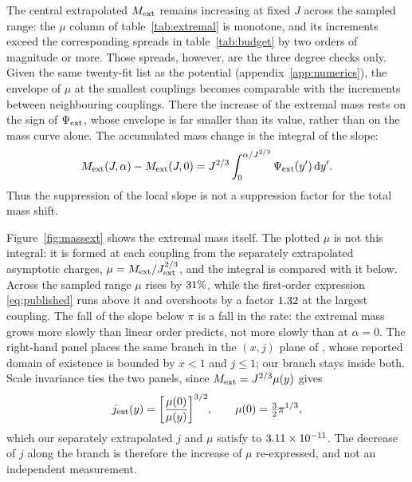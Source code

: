 \documentclass[11pt,a4paper]{article}
\begin{document}
The central extrapolated $M_{\mathrm{ext}}$ remains increasing at fixed $J$ across the
sampled range: the $\mu$ column of table~\ref{tab:extremal} is monotone, and
its increments exceed the corresponding spreads in table~\ref{tab:budget} by
two orders of magnitude or more. Those spreads, however, are the three degree
checks only. Given the same twenty-fit list as the potential
(appendix~\ref{app:numerics}), the envelope of $\mu$ at the smallest couplings
becomes comparable with the increments between neighbouring couplings. There
the increase of the extremal mass rests on the sign of $\Psi_{\mathrm{ext}}$, whose
envelope is far smaller than its value, rather than on the mass curve alone.
The accumulated mass change is the integral of the slope:
\begin{equation*}
 M_{\mathrm{ext}}(J,\alpha)-M_{\mathrm{ext}}(J,0)
 =J^{2/3}\int_0^{\alpha/J^{2/3}}\Psi_{\mathrm{ext}}(y')\,\mathrm{d} y'.
\end{equation*}
Thus the suppression of the local slope is not a suppression factor
for the total mass shift.

Figure~\ref{fig:massext} shows the extremal mass itself. The plotted $\mu$ is
not this integral: it is formed at each coupling from the separately
extrapolated asymptotic charges, $\mu=M_{\mathrm{ext}}/J_{\mathrm{ext}}^{2/3}$, and the integral is
compared with it below. Across the sampled range $\mu$ rises by
$31\%$, while the first-order
expression \eqref{eq:published} runs above it and overshoots by a factor
$1.32$ at the largest coupling. The fall of the slope below $\pi$ is a
fall in the rate: the extremal mass grows more slowly than linear order
predicts, not more slowly than at $\alpha=0$. The right-hand panel places the
same branch in the $(x,j)$ plane of \cite{Kleihaus:2023zzs}, whose reported
domain of existence is bounded by $x<1$ and $j\le1$; our branch stays inside
both. Scale invariance ties the two panels, since $M_{\mathrm{ext}}=J^{2/3}\mu(y)$ gives
\begin{equation}
 j_{\mathrm{ext}}(y)=\biggl[\frac{\mu(0)}{\mu(y)}\biggr]^{3/2},
 \qquad \mu(0)=\tfrac32\pi^{1/3},
 \label{eq:jofmu}
\end{equation}
which our separately extrapolated $j$ and $\mu$ satisfy to
$3.11\times 10^{-11}$. The decrease of $j$ along the branch is therefore the
increase of $\mu$ re-expressed, and not an independent measurement.
\end{document}
